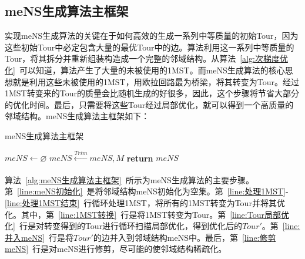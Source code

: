 \subsection{meNS生成算法主框架}
\label{subsec:NS_Method:邻域结构生成算法:meNS主框架}
实现meNS生成算法的关键在于如何高效的生成一系列中等质量的初始Tour，因为这些初始Tour中必定包含大量的最优Tour中的边。算法利用这一系列中等质量的Tour，将其拆分并重新组装构造成一个完整的邻域结构。从算法~\ref{alg:次梯度优化}~可以知道，算法产生了大量的未被使用的1MST。而meNS生成算法的核心思想就是利用这些未被使用的1MST，用欧拉回路最为桥梁，将其转变为Tour。经过1MST转变来的Tour的质量会比随机生成的好很多，因此，这个步骤将节省大部分的优化时间。最后，只需要将这些Tour经过局部优化，就可以得到一个高质量的邻域结构。meNS生成算法主框架如下：
\par
\begin{algorithm}
    \caption{meNS生成算法主框架}
    \label{alg:meNS生成算法主框架}
    \BlankLine
    $meNS \leftarrow \varnothing$ \label{line:meNS初始化} \;
     \label{line:处理1MST结束}
    $meNS \xleftarrow[]{Trim} meNS, M$ \label{line:修剪meNS} \;
    \textbf{return } $meNS$ \;
\end{algorithm}
\par
算法~\ref{alg:meNS生成算法主框架}~所示为meNS生成算法的主要步骤。第~\ref{line:meNS初始化}~是将邻域结构meNS初始化为空集。第~\ref{line:处理1MST}-\ref{line:处理1MST结束}~行循环处理1MST，将所有的1MST转变为Tour并将其优化。其中，第~\ref{line:1MST转换}~行是将1MST转变为Tour。第~\ref{line:Tour局部优化}~行是对转变得到的Tour进行循环扫描局部优化，得到优化后的$Tour'$。第~\ref{line:并入meNS}~行是将$Tour'$的边并入到邻域结构meNS中。最后，第~\ref{line:修剪meNS}~行是对meNS进行修剪，尽可能的使邻域结构稀疏化。

